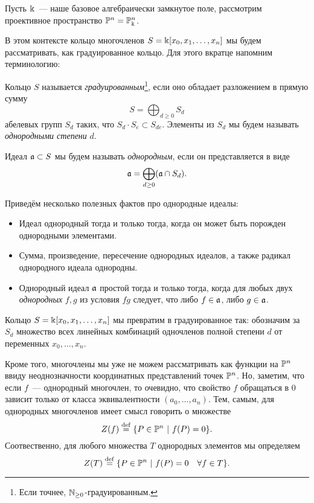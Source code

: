  	Пусть $\Bbbk$~--- наше базовое алгебраически замкнутое поле, рассмотрим проективное пространство $\mathbb{P}^n = \mathbb{P}^n_{\Bbbk}$. 

	В этом контексте кольцо многочленов $S = \Bbbk[x_0, x_1, \ldots, x_n]$ мы будем рассматривать, как градуированное кольцо. Для этого вкратце напомним терминологию: 

	\begin{definition} 
		Кольцо $S$ называется \emph{градуированным}\footnote{Если точнее, $\mathbb{N}_{\ge 0}$-градуированным. }, если оно обладает разложением в прямую сумму 
		\[
 			S	 = \bigoplus_{d \ge 0} S_{d}
 		\] 
 		абелевых групп $S_d$ таких, что $S_{d} \cdot S_{e} \subset S_{d e}$. Элементы из $S_{d}$ мы будем называть \emph{однородными степени } $d$. 

 		Идеал $\mathfrak{a} \subset S$ мы будем называть \emph{однородным}, если он представляется в виде 
 		\[
 			\mathfrak{a} = \bigoplus_{d \ge 0} (\mathfrak{a} \cap S_{d}).
 		\]
 	\end{definition} 	

 	Приведём несколько полезных фактов про однородные идеалы: 

 	\begin{itemize}
 		\item Идеал однородный тогда и только тогда, когда он может быть порожден однородными элементами. 

 		\item Сумма, произведение, пересечение однородных идеалов, а также радикал однородного идеала однородны.

 		\item Однородный идеал $\mathfrak{a}$ простой тогда и только тогда, когда для любых двух \emph{однородных} $f, g$ из условия $fg$ следует, что либо $f \in \mathfrak{a}$, либо $g \in \mathfrak{a}$. 
 	\end{itemize}

 	Кольцо $S = \Bbbk[x_0, x_1, \ldots, x_n]$ мы превратим в градуированное так: обозначим за $S_d$ множество всех линейных комбинаций одночленов полной степени $d$ от переменных $x_0, \ldots, x_n$. 

 	Кроме того, многочлены мы уже не можем рассматривать как функции на $\mathbb{P}^n$ ввиду неоднозначности координатных представлений точек $\mathbb{P}^n$. Но, заметим, что если $f$~--- однородный многочлен, то очевидно, что свойство $f$ обращаться в $0$ зависит только от класса эквивалентности $(a_0, \ldots, a_n)$. Тем, самым, для однородных многочленов имеет смысл говорить о множестве 
 	\[
 		Z(f) \stackrel{\mathrm{def}}{=} \{ P \in \mathbb{P}^n \ \vert \ f(P) = 0 \}. 
 	\]
 	Соотвественно, для любого множества $T$ однородных элементов мы определяем 
 	\[
 		Z(T) \stackrel{\mathrm{def}}{=} \{ P \in \mathbb{P}^n \ \vert \ f(P) = 0 \quad \forall f \in T \}.
 	\]

